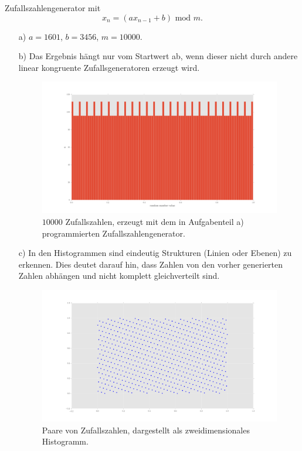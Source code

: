 Zufallszahlengenerator mit
\begin{equation}
x_n=(ax_{n-1}+b) \text{ mod } m .
\end{equation}

\begin{itemize}


\item[a)] $a=1601$, $b=3456$, $m=10000$.
\item[b)] Das Ergebnis hängt nur vom Startwert ab, wenn dieser nicht durch andere linear kongruente Zufallsgeneratoren erzeugt wird.
\begin{figure}
\centering
\includegraphics[width=\textwidth]{linear_kongruent_random_numbers.png}
\caption{$10000$ Zufallszahlen, erzeugt mit dem in Aufgabenteil a) programmierten Zufallszahlengenerator.}
\label{fig:2b}
\end{figure}
\item[c)] In den Histogrammen sind eindeutig Strukturen (Linien oder Ebenen) zu erkennen. Dies deutet darauf hin, dass Zahlen von den vorher generierten Zahlen abhängen und nicht komplett gleichverteilt sind.
\begin{figure}
\centering
\includegraphics[width=\textwidth]{2dscatter.png}
\caption{Paare von Zufallszahlen, dargestellt als zweidimensionales Histogramm.}
\label{fig:2c1}
\end{figure}


\end{itemize}

